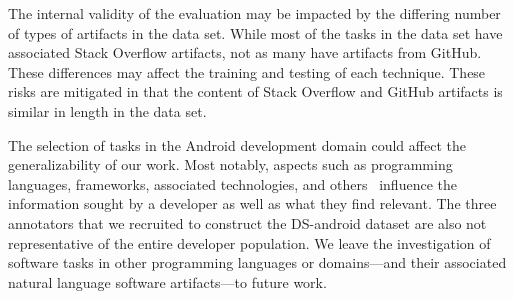 The internal validity of the evaluation
may be impacted by the differing number of
types of artifacts in the data set.
While most of the tasks in the data set have
associated 
 Stack Overflow artifacts, not as many have artifacts from GitHub.
These differences may affect the training
and testing of each technique. These
risks are mitigated in that 
 the content of Stack Overflow and GitHub artifacts is similar in length in the data set.






The selection of tasks in the Android development domain could 
affect the generalizability of our work. Most notably, 
aspects such as programming languages, frameworks, associated technologies, and others~\cite{baltes2019}
influence the information sought by a developer as well as what they find relevant.
The three annotators that we recruited to construct the \acs{DS-android} dataset are also not representative 
of the entire developer population. We leave the investigation of software tasks in other programming languages or domains---and their associated natural language software artifacts---to future work.

